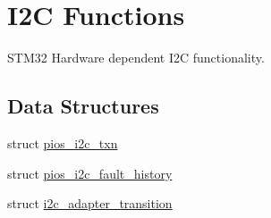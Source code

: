 \hypertarget{group___p_i_o_s___i2_c}{\section{\-I2\-C \-Functions}
\label{group___p_i_o_s___i2_c}
}


\-S\-T\-M32 \-Hardware dependent \-I2\-C functionality.  


\subsection*{\-Data \-Structures}
\begin{DoxyCompactItemize}
\item 
struct \hyperlink{structpios__i2c__txn}{pios\-\_\-i2c\-\_\-txn}
\item 
struct \hyperlink{structpios__i2c__fault__history}{pios\-\_\-i2c\-\_\-fault\-\_\-history}
\item 
struct \hyperlink{structi2c__adapter__transition}{i2c\-\_\-adapter\-\_\-transition}
\end{DoxyCompactItemize}
